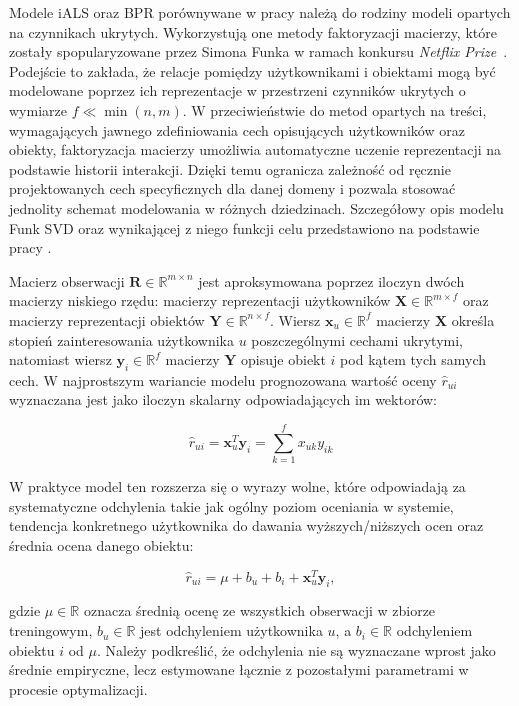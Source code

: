 Modele iALS oraz BPR porównywane w pracy należą do rodziny modeli opartych na czynnikach ukrytych. Wykorzystują one metody faktoryzacji macierzy, które zostały spopularyzowane przez Simona Funka w ramach konkursu \textit{Netflix Prize}~\cite{funk2006netflix}. Podejście to zakłada, że relacje pomiędzy użytkownikami i obiektami mogą być modelowane poprzez ich reprezentacje w przestrzeni czynników ukrytych o wymiarze $f \ll \min(n,m)$. W przeciwieństwie do metod opartych na treści, wymagających jawnego zdefiniowania cech opisujących użytkowników oraz obiekty, faktoryzacja macierzy umożliwia automatyczne uczenie reprezentacji na podstawie historii interakcji. Dzięki temu ogranicza zależność od ręcznie projektowanych cech specyficznych dla danej domeny i pozwala stosować jednolity schemat modelowania w różnych dziedzinach. Szczegółowy opis modelu Funk SVD oraz wynikającej z niego funkcji celu przedstawiono na podstawie pracy \cite{koren2009matrix}.

Macierz obserwacji $\mathbf{R} \in \mathbb{R}^{m \times n}$ jest aproksymowana poprzez iloczyn dwóch macierzy niskiego rzędu: macierzy reprezentacji użytkowników $\mathbf{X} \in \mathbb{R}^{m \times f}$ oraz macierzy reprezentacji obiektów $\mathbf{Y} \in \mathbb{R}^{n \times f}$. Wiersz $\mathbf{x}_u \in \mathbb{R}^f$ macierzy $\mathbf{X}$ określa stopień zainteresowania użytkownika $u$ poszczególnymi cechami ukrytymi, natomiast wiersz $\mathbf{y}_i \in \mathbb{R}^f$ macierzy $\mathbf{Y}$ opisuje obiekt $i$ pod kątem tych samych cech. W najprostszym wariancie modelu prognozowana wartość oceny $\hat{r}_{ui}$ wyznaczana jest jako iloczyn skalarny odpowiadających im wektorów:

\begin{equation}    
    \hat{r}_{ui} = \mathbf{x}_u^T \mathbf{y}_i = \sum_{k=1}^{f} x_{uk} y_{ik}
\end{equation}

W praktyce model ten rozszerza się o wyrazy wolne, które odpowiadają za systematyczne odchylenia takie jak ogólny poziom oceniania w systemie, tendencja konkretnego użytkownika do dawania wyższych/niższych ocen oraz średnia ocena danego obiektu:

\begin{equation}
    \hat{r}_{ui} = \mu + b_u + b_i + \mathbf{x}_u^T \mathbf{y}_i,
\end{equation}

gdzie $\mu \in \mathbb{R}$ oznacza średnią ocenę ze wszystkich obserwacji w zbiorze treningowym, $b_u \in \mathbb{R}$ jest odchyleniem użytkownika $u$, a $b_i \in \mathbb{R}$ odchyleniem obiektu $i$ od $\mu$. Należy podkreślić, że odchylenia nie są wyznaczane wprost jako średnie empiryczne, lecz estymowane łącznie z pozostałymi parametrami w procesie optymalizacji.


